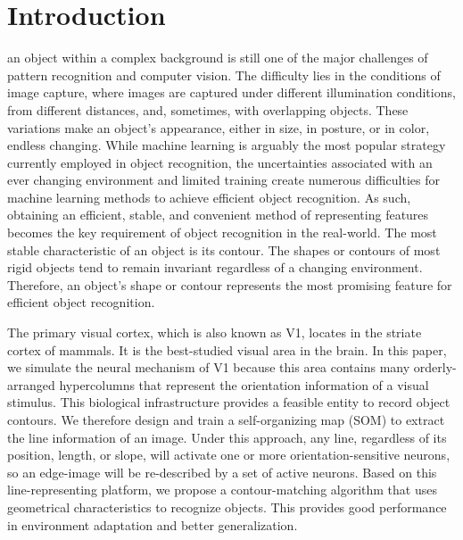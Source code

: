 \documentclass[journal]{IEEEtran}
\begin{document}
\IEEEpeerreviewmaketitle

\section{Introduction}


an object within a complex background is still one of the major challenges of pattern recognition and computer vision. 
The difficulty lies in the conditions of image capture,
where images are captured under different illumination conditions, 
from different distances, and, sometimes, with overlapping objects.
These variations make an object's appearance, either in size, in posture, or in color, endless changing. 
While machine learning is arguably the most popular strategy currently employed in object recognition, 
the uncertainties associated with an ever changing environment and limited training create numerous difficulties for machine learning methods to achieve efficient object recognition. 
As such, obtaining an efficient, stable, and convenient method of representing features becomes the key requirement of object recognition in the real-world. 
The most stable characteristic of an object is its contour. 
The shapes or contours of most rigid objects tend to remain invariant regardless of a changing environment. 
Therefore, an object's shape or contour represents the most promising feature for efficient object recognition.


The primary visual cortex, which is also known as V1, locates in the striate cortex of mammals.
It is the best-studied visual area in the brain.
In this paper, we simulate the neural mechanism of V1 because this area contains many orderly-arranged hypercolumns that represent the orientation information of a visual stimulus.
This biological infrastructure provides a feasible entity to record object contours. 
We therefore design and train a self-organizing map (SOM) to extract the line information of an image. 
Under this approach, any line, regardless of its position, length, or slope, 
will activate one or more orientation-sensitive neurons, 
so an edge-image will be re-described by a set of active neurons. 
Based on this line-representing platform, 
we propose a contour-matching algorithm that uses geometrical characteristics to recognize objects. 
This provides good performance in environment adaptation and better generalization.
\end{document}

